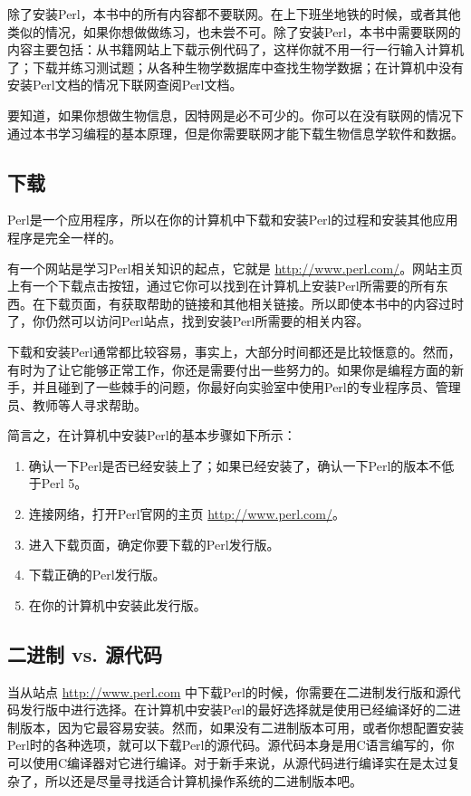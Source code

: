 除了安装Perl，本书中的所有内容都不要联网。在上下班坐地铁的时候，或者其他类似的情况，如果你想做做练习，也未尝不可。除了安装Perl，本书中需要联网的内容主要包括：从书籍网站上下载示例代码了，这样你就不用一行一行输入计算机了；下载并练习测试题；从各种生物学数据库中查找生物学数据；在计算机中没有安装Perl文档的情况下联网查阅Perl文档。

要知道，如果你想做生物信息，因特网是必不可少的。你可以在没有联网的情况下通过本书学习编程的基本原理，但是你需要联网才能下载生物信息学软件和数据。

\subsection{下载}
Perl是一个应用程序，所以在你的计算机中下载和安装Perl的过程和安装其他应用程序是完全一样的。

有一个网站是学习Perl相关知识的起点，它就是 \href{http://www.perl.com/}{http://www.perl.com/}。网站主页上有一个下载点击按钮，通过它你可以找到在计算机上安装Perl所需要的所有东西。在下载页面，有获取帮助的链接和其他相关链接。所以即使本书中的内容过时了，你仍然可以访问Perl站点，找到安装Perl所需要的相关内容。

下载和安装Perl通常都比较容易，事实上，大部分时间都还是比较惬意的。然而，有时为了让它能够正常工作，你还是需要付出一些努力的。如果你是编程方面的新手，并且碰到了一些棘手的问题，你最好向实验室中使用Perl的专业程序员、管理员、教师等人寻求帮助。

简言之，在计算机中安装Perl的基本步骤如下所示：

\begin{enumerate}
  \item 确认一下Perl是否已经安装上了；如果已经安装了，确认一下Perl的版本不低于Perl 5。
  \item 连接网络，打开Perl官网的主页 \href{http://www.perl.com/}{http://www.perl.com/}。
  \item 进入下载页面，确定你要下载的Perl发行版。
  \item 下载正确的Perl发行版。
  \item 在你的计算机中安装此发行版。
\end{enumerate}

\subsection{二进制 vs. 源代码}
当从站点 \href{http://www.perl.com}{http://www.perl.com} 中下载Perl的时候，你需要在二进制发行版和源代码发行版中进行选择。在计算机中安装Perl的最好选择就是使用已经编译好的二进制版本，因为它最容易安装。然而，如果没有二进制版本可用，或者你想配置安装Perl时的各种选项，就可以下载Perl的源代码。源代码本身是用C语言编写的，你可以使用C编译器对它进行编译。对于新手来说，从源代码进行编译实在是太过复杂了，所以还是尽量寻找适合计算机操作系统的二进制版本吧。

